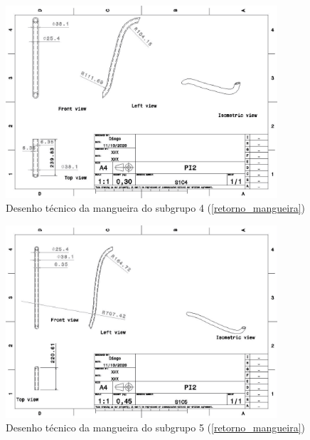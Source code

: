 \begin{apendicesenv}
\begin{figure}[H]
    \centering
    \includegraphics[width=0.9\textwidth]{figuras/estrutura/Desenhos/Drawing1_S1C4.jpg}
    \caption{Desenho técnico da mangueira do subgrupo 4 (\ref{retorno_mangueira})}
    \label{fig:M_S4}
\end{figure}

\begin{figure}[H]
    \centering
    \includegraphics[width=0.9\textwidth]{figuras/estrutura/Desenhos/Drawing1_S1C5.jpg}
    \caption{Desenho técnico da mangueira do subgrupo 5 (\ref{retorno_mangueira})}
    \label{fig:M_S5}
\end{figure}


\end{apendicesenv}
